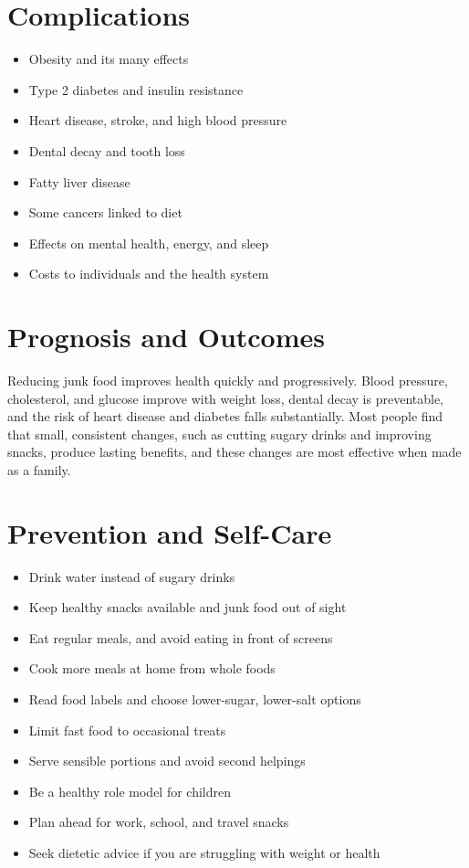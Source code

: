 \section*{Complications}
\begin{itemize}
    \item Obesity and its many effects
    \item Type 2 diabetes and insulin resistance
    \item Heart disease, stroke, and high blood pressure
    \item Dental decay and tooth loss
    \item Fatty liver disease
    \item Some cancers linked to diet
    \item Effects on mental health, energy, and sleep
    \item Costs to individuals and the health system
\end{itemize}

\section*{Prognosis and Outcomes}
Reducing junk food improves health quickly and progressively. Blood pressure, cholesterol, and glucose improve with weight loss, dental decay is preventable, and the risk of heart disease and diabetes falls substantially. Most people find that small, consistent changes, such as cutting sugary drinks and improving snacks, produce lasting benefits, and these changes are most effective when made as a family.

\section*{Prevention and Self-Care}
\begin{itemize}
    \item Drink water instead of sugary drinks
    \item Keep healthy snacks available and junk food out of sight
    \item Eat regular meals, and avoid eating in front of screens
    \item Cook more meals at home from whole foods
    \item Read food labels and choose lower-sugar, lower-salt options
    \item Limit fast food to occasional treats
    \item Serve sensible portions and avoid second helpings
    \item Be a healthy role model for children
    \item Plan ahead for work, school, and travel snacks
    \item Seek dietetic advice if you are struggling with weight or health
\end{itemize}

